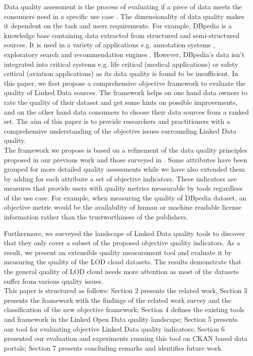 \documentclass[onecolumn, crcready]{iosart2c}
\begin{document}
Data quality assessment is the process of evaluating if a piece of data meets the consumers need in a specific use case \cite{Bizer:2009:QIF:1482178.1482280}. The dimensionality of data quality makes it dependent on the task and users requirements. For example, DBpedia \cite{bizer_dbpedia_2009} is a knowledge base containing data extracted from structured and semi-structured sources. It is used in a variety of applications  e.g. annotation systems \cite{Mendes:2011:DSS:2063518.2063519}, exploratory search \cite{Marie:2013:DHO:2506182.2506185} and recommendation engines \cite{conf/iir/MirizziNROS12}. However, DBpedia's data isn't integrated into critical systems e.g. life critical (medical applications) or safety critical (aviation applications) as its data quality is found to be insufficient. In this paper, we first propose a comprehensive objective framework to evaluate the quality of Linked Data sources. The framework helps on one hand data owners to rate the quality of their dataset and get some hints on possible improvements, and on the other hand data consumers to choose their data sources from a ranked set. The aim of this paper is to provide researchers and practitioners with a comprehensive understanding of the objective issues surrounding Linked Data quality.\\

The framework we propose is based on a refinement of the data quality principles proposed in our previous work \cite{assaf2012} and those surveyed in \cite{Framework2012}. Some attributes have been grouped for more detailed quality assessments while we have also extended them by adding for each attribute a set of objective indicators. These indicators are measures that provide users with quality metrics measurable by tools regardless of the use case. For example, when measuring the quality of DBpedia dataset, an objective metric would be the availability of human or machine readable license information rather than the trustworthiness of the publishers.

Furthermore, we surveyed the landscape of Linked Data quality tools to discover that they only cover a subset of the proposed objective quality indicators. As a result, we present an extensible quality measurement tool and evaluate it by measuring the quality of the LOD cloud datasets. The results demonstrate that the general quality of LOD cloud needs more attention as most of the datasets suffer from various quality issues.\\

This paper is structured as follows: Section 2 presents the related work, Section 3 presents the framework with the findings of the related work survey and the classification of the new objective framework; Section 4 defines the existing tools and framework in the Linked Open Data quality landscape; Section 5 presents our tool for evaluating objective Linked Data quality indicators; Section 6 presented our evaluation and experiments running this tool on CKAN based data portals; Section 7 presents concluding remarks and identifies future work.
\end{document}
